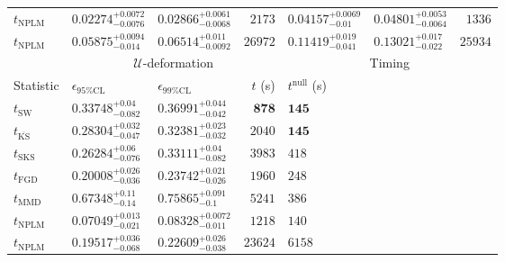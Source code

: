 \begin{tabular}{l|llr|llr}
\rowcolor{red!35}	$t_{\mathrm{NPLM}}$ & $0.02274_{-0.0076}^{+0.0072}$ & $0.02866_{-0.0068}^{+0.0061}$ & $2173$ & $0.04157_{-0.01}^{+0.0069}$ & $0.04801_{-0.0064}^{+0.0053}$ & $1336$ \\
\rowcolor{blue!35}	$t_{\mathrm{NPLM}}$ & $0.05875_{-0.014}^{+0.0094}$ & $0.06514_{-0.0092}^{+0.011}$ & $26972$ & $0.11419_{-0.041}^{+0.019}$ & $0.13021_{-0.022}^{+0.017}$ & $25934$ \\
	\toprule
	\multicolumn{1}{c}{} & \multicolumn{3}{c}{$\mathcal{U}$-deformation} & \multicolumn{3}{c}{Timing} \\
Statistic & $\epsilon_{95\%\mathrm{CL}}$ & $\epsilon_{99\%\mathrm{CL}}$ & $t$ (s) & $t^{\mathrm{null}}$ (s) \\
	\midrule
	$t_{\mathrm{SW}}$ & $0.33748_{-0.082}^{+0.04}$ & $0.36991_{-0.042}^{+0.044}$ & ${\mathbf{878}}$ & ${\mathbf{145}}$ \\
	$t_{\overline{\mathrm{KS}}}$ & $0.28304_{-0.047}^{+0.032}$ & $0.32381_{-0.032}^{+0.023}$ & $2040$ & ${\mathbf{145}}$ \\
	$t_{\mathrm{SKS}}$ & $0.26284_{-0.076}^{+0.06}$ & $0.33111_{-0.082}^{+0.04}$ & $3983$ & $418$ \\
	$t_{\mathrm{FGD}}$ & ${\mathbf{0.20008_{-0.036}^{+0.026}}}$ & ${\mathbf{0.23742_{-0.026}^{+0.021}}}$ & $1960$ & $248$ \\
	$t_{\mathrm{MMD}}$ & $0.67348_{-0.14}^{+0.11}$ & $0.75865_{-0.1}^{+0.091}$ & $5241$ & $386$ \\
\rowcolor{red!35}	$t_{\mathrm{NPLM}}$ & $0.07049_{-0.021}^{+0.013}$ & $0.08328_{-0.011}^{+0.0072}$ & $1218$ & $140$ \\
\rowcolor{blue!35}	$t_{\mathrm{NPLM}}$ & $0.19517_{-0.068}^{+0.036}$ & $0.22609_{-0.038}^{+0.026}$ & $23624$ & $6158$ \\
	\bottomrule
\end{tabular}